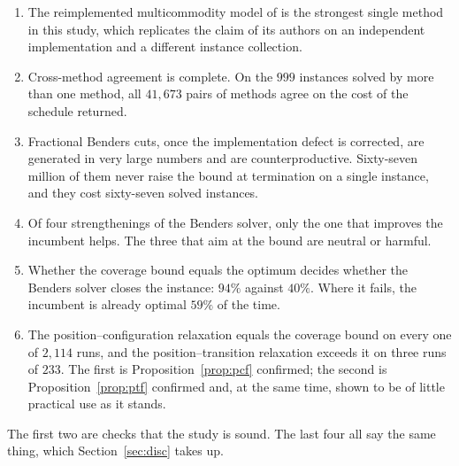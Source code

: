 \begin{enumerate}[topsep=4pt,itemsep=3pt]
  \item The reimplemented multicommodity model of \citet{daSilva2024} is the strongest
  single method in this study, which replicates the claim of its authors on an
  independent implementation and a different instance collection.

  \item Cross-method agreement is complete. On the $999$ instances solved by more than
  one method, all $41{,}673$ pairs of methods agree on the cost of the schedule
  returned.

  \item Fractional Benders cuts, once the implementation defect is corrected, are
  generated in very large numbers and are counterproductive. Sixty-seven million of
  them never raise the bound at termination on a single instance, and they cost
  sixty-seven solved instances.

  \item Of four strengthenings of the Benders solver, only the one that improves the
  incumbent helps. The three that aim at the bound are neutral or harmful.

  \item Whether the coverage bound equals the optimum decides whether the Benders
  solver closes the instance: $94\%$ against $40\%$. Where it fails, the incumbent is
  already optimal $59\%$ of the time.

  \item The position--configuration relaxation equals the coverage bound on every one
  of $2{,}114$ runs, and the position--transition relaxation exceeds it on three runs of
  $233$. The first is Proposition~\ref{prop:pcf} confirmed; the second is
  Proposition~\ref{prop:ptf} confirmed and, at the same time, shown to be of little
  practical use as it stands.
\end{enumerate}

\noindent
The first two are checks that the study is sound. The last four all say the same thing,
which Section~\ref{sec:disc} takes up.
